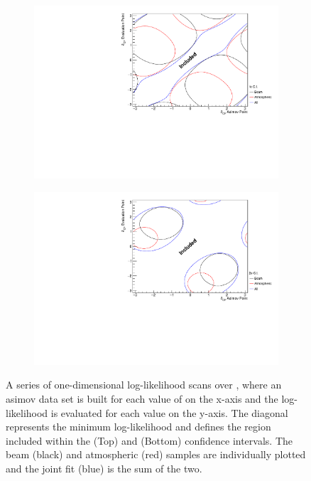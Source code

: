 \begin{figure}[h]
  \begin{subfigure}[t]{1.0\textwidth}
    \includegraphics[width=\textwidth, trim={0mm 0mm 0mm 0mm}, clip,page=1]{Figures/OA/DCP_Scans_1Sig.pdf}
  \end{subfigure}
  \begin{subfigure}[t]{1.0\textwidth}
    \includegraphics[width=\textwidth, trim={0mm 0mm 0mm 0mm}, clip,page=1]{Figures/OA/DCP_Scans_2Sig.pdf}
  \end{subfigure}
  \caption{A series of one-dimensional log-likelihood scans over \dcp, where an asimov data set is built for each value of \dcp on the x-axis and the log-likelihood is evaluated for each value on the y-axis. The diagonal represents the minimum log-likelihood and defines the region included within the \quickmath{1\sigma} (Top) and \quickmath{2\sigma} (Bottom) confidence intervals. The beam (black) and atmospheric (red) samples are individually plotted and the joint fit (blue) is the sum of the two.}
  \label{fig:OscillationAnalysis_AsimovEval_DCP}
\end{figure}

